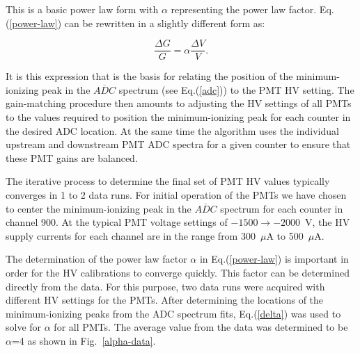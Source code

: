 \documentclass{elsart}
\begin{document}
\noindent
This is a basic power law form with $\alpha$ representing the power law factor. Eq.(\ref{power-law})
can be rewritten in a slightly different form as:

\begin{equation}
\label{delta}
\frac{\Delta G}{G} = \alpha \frac{\Delta V}{V}.
\end{equation}

It is this expression that is the basis for relating the position of the minimum-ionizing peak in the
$\overline{ADC}$ spectrum (see Eq.(\ref{adc})) to the PMT HV setting. The gain-matching procedure
then amounts to adjusting the HV settings of all PMTs to the values required to position the
minimum-ionizing peak for each counter in the desired ADC location. At the same time the algorithm uses
the individual upstream and downstream PMT ADC spectra for a given counter to ensure that these PMT
gains are balanced.

The iterative process to determine the final set of PMT HV values typically converges in 1 to 2 data runs.
For initial operation of the PMTs we have chosen to center the minimum-ionizing peak in the
$\overline{ADC}$ spectrum for each counter in channel 900. At the typical PMT voltage settings of
$-1500 \to -2000$~V, the HV supply currents for each channel are in the range from 300~$\mu$A to
500~$\mu$A. 

The determination of the power law factor $\alpha$ in Eq.(\ref{power-law}) is important in order for the
HV calibrations to converge quickly. This factor can be determined directly from the data. For this purpose,
two data runs were acquired with different HV settings for the PMTs. After determining the locations of
the minimum-ionizing peaks from the ADC spectrum fits, Eq.(\ref{delta}) was used to solve for $\alpha$
for all PMTs. The average value from the data was determined to be $\alpha$=4 as shown in
Fig.~\ref{alpha-data}.
\end{document}
